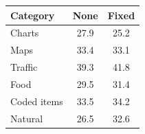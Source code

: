 \begin{tabular}{@{}lcc@{}}
\toprule
Category & None & Fixed \\
\midrule
Charts & 27.9 & 25.2 \\
Maps & 33.4 & 33.1 \\
Traffic & 39.3 & 41.8 \\
Food & 29.5 & 31.4 \\
Coded items & 33.5 & 34.2 \\
Natural & 26.5 & 32.6 \\
\bottomrule
\end{tabular}
